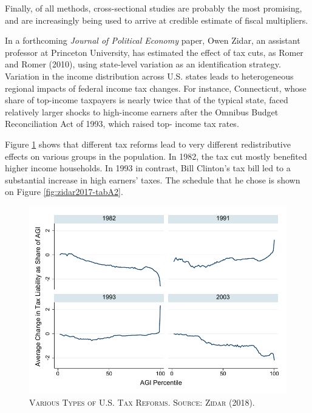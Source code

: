 \documentclass[]{book}
\begin{document}
Finally, of all methods, cross-sectional studies are probably the most
promising, and are increasingly being used to arrive at credible
estimate of fiscal multipliers.

In a forthcoming \emph{Journal of Political Economy} paper, Owen Zidar,
an assistant professor at Princeton University, has estimated the effect
of tax cuts, as Romer and Romer (2010), using state-level variation as
an identification strategy. Variation in the income distribution across
U.S. states leads to heterogeneous regional impacts of federal income
tax changes. For instance, Connecticut, whose share of top-income
taxpayers is nearly twice that of the typical state, faced relatively
larger shocks to high-income earners after the Omnibus Budget
Reconciliation Act of 1993, which raised top- income tax rates.

Figure \ref{fig:zidar2017-fig1} shows that different tax reforms lead to
very different redistributive effects on various groups in the
population. In 1982, the tax cut mostly benefited higher income
households. In 1993 in contrast, Bill Clinton's tax bill led to a
substantial increase in high earners' taxes. The schedule that he chose
is shown on Figure \ref{fig:zidar2017-tabA2}.




\begin{figure}

{\centering \includegraphics[width=0.8\linewidth,height=0.8\textheight]{figures/Zidar2017/fig1} 

}

\caption{\textsc{Various Types of U.S. Tax Reforms. Source:
Zidar (2018).}}\label{fig:zidar2017-fig1}
\end{figure}
\end{document}
